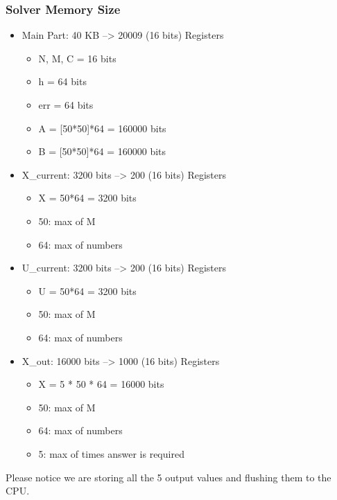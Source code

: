 \documentclass[12pt]{report}
\begin{document}
\subsubsection{Solver Memory Size}
\begin{itemize}
    \item Main Part: 40 KB --> 20009 (16 bits) Registers
    \begin{itemize}
        \item N, M, C = 16 bits
        \item h = 64 bits
        \item err = 64 bits
        \item A = [50*50]*64 = 160000 bits
        \item B = [50*50]*64 = 160000 bits
    \end{itemize}
    \item X\_current: 3200 bits --> 200 (16 bits) Registers
    \begin{itemize}
        \item X = 50*64 = 3200 bits
        \item 50: max of M
        \item 64: max of numbers
    \end{itemize}
    \item U\_current: 3200 bits --> 200 (16 bits) Registers
    \begin{itemize}
        \item U = 50*64 = 3200 bits
        \item 50: max of M
        \item 64: max of numbers
    \end{itemize}
    \item X\_out: 16000 bits --> 1000 (16 bits) Registers
    \begin{itemize}
        \item X = 5 * 50 * 64 = 16000 bits
        \item 50: max of M
        \item 64: max of numbers
        \item 5: max of times answer is required
    \end{itemize}
\end{itemize}
Please notice we are storing all the 5 output values and flushing them to the CPU.
\end{document}

